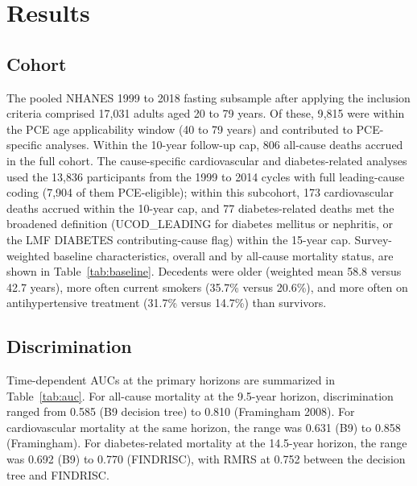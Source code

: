\documentclass[11pt]{article}
\begin{document}
\section*{Results}

\subsection*{Cohort}

The pooled NHANES 1999 to 2018 fasting subsample after applying the inclusion criteria comprised 17{,}031 adults aged 20 to 79 years. Of these, 9{,}815 were within the PCE age applicability window (40 to 79 years) and contributed to PCE-specific analyses. Within the 10-year follow-up cap, 806 all-cause deaths accrued in the full cohort. The cause-specific cardiovascular and diabetes-related analyses used the 13{,}836 participants from the 1999 to 2014 cycles with full leading-cause coding (7{,}904 of them PCE-eligible); within this subcohort, 173 cardiovascular deaths accrued within the 10-year cap, and 77 diabetes-related deaths met the broadened definition (UCOD\_LEADING for diabetes mellitus or nephritis, or the LMF DIABETES contributing-cause flag) within the 15-year cap. Survey-weighted baseline characteristics, overall and by all-cause mortality status, are shown in Table~\ref{tab:baseline}. Decedents were older (weighted mean 58.8 versus 42.7 years), more often current smokers (35.7\% versus 20.6\%), and more often on antihypertensive treatment (31.7\% versus 14.7\%) than survivors.



\subsection*{Discrimination}

Time-dependent AUCs at the primary horizons are summarized in Table~\ref{tab:auc}. For all-cause mortality at the 9.5-year horizon, discrimination ranged from 0.585 (B9 decision tree) to 0.810 (Framingham 2008). For cardiovascular mortality at the same horizon, the range was 0.631 (B9) to 0.858 (Framingham). For diabetes-related mortality at the 14.5-year horizon, the range was 0.692 (B9) to 0.770 (FINDRISC), with RMRS at 0.752 between the decision tree and FINDRISC.
\end{document}
